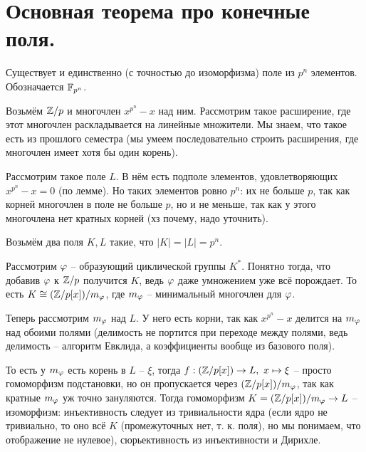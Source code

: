 \section{
 Основная теорема про конечные поля.
}

\thrm Существует и единственно (с точностью до изоморфизма) поле из $p^n$ элементов. Обозначается $\mathbb{F}_{p^n}$.


	
	Возьмём $\mathbb{Z}/p$ и многочлен $x^{p^n} - x$ над ним. Рассмотрим такое расширение, где этот многочлен раскладывается на линейные множители. Мы знаем, что такое есть из прошлого семестра (мы умеем последовательно строить расширения, где многочлен имеет хотя бы один корень).

	Рассмотрим такое поле $L$. В нём есть подполе элементов, удовлетворяющих $x^{p^n} - x = 0$ (по лемме). Но таких элементов ровно $p^n$: их не больше $p$, так как корней многочлен в поле не больше $p$, но и не меньше, так как у этого многочлена нет кратных корней (хз почему, надо уточнить).



	Возьмём два поля $K, L$ такие, что $|K| = |L| = p^n$.

	Рассмотрим $\varphi$ -- образующий циклической группы $K^*$. Понятно тогда, что добавив $\varphi$ к $\mathbb{Z}/p$ получится $K$, ведь $\varphi$ даже умножением уже всё порождает. То есть $K \cong (\mathbb{Z}/p[x])/m_{\varphi}$, где $m_{\varphi}$ -- минимальный многочлен для $\varphi$.

	Теперь рассмотрим $m_{\varphi}$ над $L$. У него есть корни, так как $x^{p^n} - x$ делится на $m_{\varphi}$ над обоими полями (делимость не портится при переходе между полями, ведь делимость -- алгоритм Евклида, а коэффициенты вообще из базового поля). 

	То есть у $m_{\varphi}$ есть корень в $L$ -- $\xi$, тогда $f : (\mathbb{Z}/p[x]) \to L,\ x \mapsto \xi$ -- просто гомоморфизм подстановки, но он пропускается через $(\mathbb{Z}/p[x])/m_{\varphi}$, так как кратные $m_{\varphi}$ уж точно зануляются. Тогда гомоморфизм $K = (\mathbb{Z}/p[x])/m_{\varphi} \to L$ -- изоморфизм: инъективность следует из тривиальности ядра (если ядро не тривиально, то оно всё $K$ (промежуточных нет, т. к. поля), но мы понимаем, что отображение не нулевое), сюрьективность из инъективности и Дирихле.

\ethrm